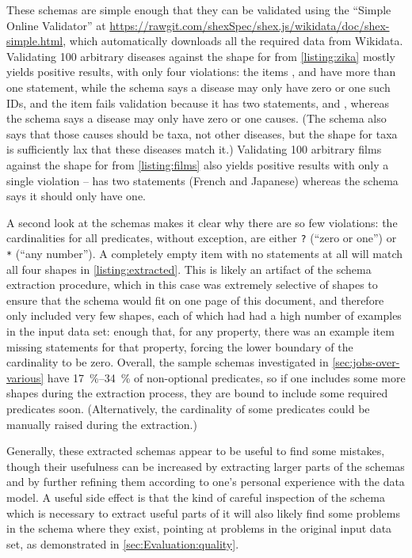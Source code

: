 These schemas are simple enough that they can be validated using the “Simple Online Validator”
at \url{https://rawgit.com/shexSpec/shex.js/wikidata/doc/shex-simple.html},
which automatically downloads all the required data from Wikidata.
Validating 100 arbitrary diseases
against the shape for  from \cref{listing:zika} mostly yields positive results,
with only four violations:
the items ,
 and 
have more than one  statement, while the schema says a disease may only have zero or one such IDs,
and the item  fails validation because it has two  statements,
 and ,
whereas the schema says a disease may only have zero or one causes.
(The schema also says that those causes should be taxa, not other diseases,
but the shape for taxa is sufficiently lax that these diseases match it.)
Validating 100 arbitrary films
against the shape for  from \cref{listing:films} also yields positive results with only a single violation –
 has two  statements (French and Japanese)
whereas the schema says it should only have one.

A second look at the schemas makes it clear why there are so few violations:
the cardinalities for all predicates, without exception,
are either \lstinline{?} (“zero or one”) or \lstinline{*} (“any number”).
A completely empty item with no statements at all
will match all four shapes in \cref{listing:extracted}.
This is likely an artifact of the schema extraction procedure,
which in this case was extremely selective of shapes
to ensure that the schema would fit on one page of this document,
and therefore only included very few shapes,
each of which had had a high number of examples in the input data set:
enough that, for any property,
there was an example item missing statements for that property,
forcing the lower boundary of the cardinality to be zero.
Overall, the sample schemas investigated in \cref{sec:jobs-over-various}
have \SIrange{17}{34}{\percent} of non-optional predicates,
so if one includes some more shapes during the extraction process,
they are bound to include some required predicates soon.
(Alternatively, the cardinality of some predicates could be manually raised during the extraction.)

Generally, these extracted schemas appear to be useful to find some mistakes,
though their usefulness %
can be increased by extracting larger parts of the schemas
and by further refining them according to one’s personal experience with the data model.
A useful side effect is that the kind of careful inspection of the schema
which is necessary to extract useful parts of it
will also likely find some problems in the schema where they exist,
pointing at problems %
in the original input data set,
as demonstrated in \cref{sec:Evaluation:quality}.

